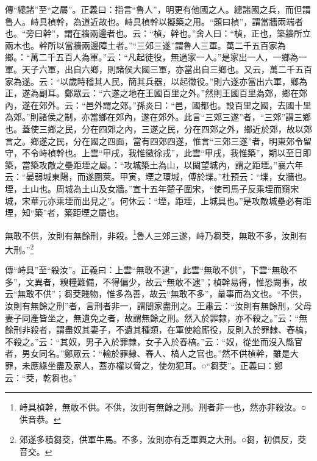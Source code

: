 {\noindent\zhuan{}\fzbyks 傳“總諸”至“之屬”。正義曰：指言“魯人”，明更有他國之人。總諸國之兵，而但謂魯人。峙具楨幹，為道近故也。峙具楨幹以擬築之用。“題曰楨”，謂當牆兩端者也。“旁曰幹”，謂在牆兩邊者也。云：“楨，幹也。”舍人曰：“楨，正也，築牆所立兩木也。幹所以當牆兩邊障土者。”“三郊三遂”謂魯人三軍。萬二千五百家為鄉。：“萬二千五百人為軍。”云：“凡起徒役，無過家一人。”是家出一人，一鄉為一軍。天子六軍，出自六鄉，則諸侯大國三軍，亦當出自三鄉也。又云，萬二千五百家為遂。云：“以歲時稽其人民，簡其兵器，以起徵役。”則六遂亦當出六軍，鄉為正，遂為副耳。鄭眾云：“六遂之地在王國百里之外。”然則王國百里為郊，鄉在郊內，遂在郊外。云：“邑外謂之郊。”孫炎曰：“邑，國都也。設百里之國，去國十里為郊。”則諸侯之制，亦當鄉在郊內，遂在郊外。此言“三郊三遂”者，“三郊”謂三鄉也。蓋使三鄉之民，分在四郊之內，三遂之民，分在四郊之外，鄉近於郊，故以郊言之。鄉遂之民，分在國之四面，當有四郊四遂，惟言“三郊三遂”者，明東郊令留守，不令峙楨幹也。上雲“甲戌，我惟徵徐戎”，此雲“甲戌，我惟築”，期以至日即築，當築攻敵之壘距堙之屬。：“攻城築土為山，以闚望城內，謂之距堙。”襄六年云：“晏弱城東陽，而遂圍萊。甲寅，堙之環城，傅於堞。”杜預云：“堞，女牆也。堙，土山也。周城為土山及女牆。”宣十五年楚子圍宋，“使司馬子反乘堙而窺宋城，宋華元亦乘堙而出見之”。何休云：“堙，距堙，上城具也。”是攻敵城壘必有距堙，知“築”者，築距堙之屬也。 \par}

無敢不供，汝則有無餘刑，非殺。\footnote{峙具楨幹，無敢不供。不供，汝則有無餘之刑。刑者非一也，然亦非殺汝。○供音恭。}魯人三郊三遂，峙乃芻茭，無敢不多，汝則有大刑。”\footnote{郊遂多積芻茭，供軍牛馬。不多，汝則亦有乏軍興之大刑。○芻，初俱反，茭音交。}

{\noindent\zhuan{}\fzbyks 傳“峙具”至“殺汝”。正義曰：上雲“無敢不逮”，此雲“無敢不供”，下雲“無敢不多”，文異者，糗糧難備，不得偏少，故云“無敢不逮”；楨幹易得，惟恐闕事，故云“無敢不供”；芻茭賤物，惟多為善，故云“無敢不多”，量事而為文也。“不供，汝則有無餘之刑”者，言刑者非一，謂閤家盡刑之。王肅云：“汝則有無餘刑，父母妻子同產皆坐之，無遺免之者，故謂無餘之刑。然入於罪隸，亦不殺之。”云：“無餘刑非殺者，謂盡奴其妻子，不遺其種類，在軍使給廝役，反則入於罪隸、舂槁，不殺之。”云：“其奴，男子入於罪隸，女子入於舂槁。”云：“奴，從坐而沒入縣官者，男女同名。”鄭眾云：“輸於罪隸、舂人、槁人之官也。”然不供楨幹，雖是大罪，未應緣坐盡及家人，蓋亦權以脅之，使勿犯耳。○“芻茭”。正義曰：鄭云：“茭，乾芻也。” \par}

